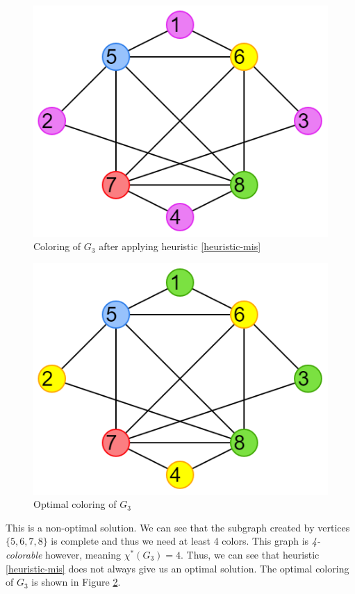 \documentclass{article}
\newcounter{heuristic} \setcounter{heuristic}{0}
\theoremstyle{definition}
\begin{document}
\begin{multicols}{2}
  \begin{figure}[H]
  \centering
  \includegraphics[scale=0.5]{images/mis-2.png}
  \caption{Coloring of \(G_3\) after applying heuristic \ref{heuristic-mis}}\label{fig:ex3-colored}
  \end{figure}

  \begin{figure}[H]
  \centering
  \includegraphics[scale=0.5]{images/mis-3.png}
  \caption{Optimal coloring of \(G_3\)}\label{fig:ex3-optimal}
  \end{figure}
\end{multicols}

This is a non-optimal solution. We can see that the subgraph created by vertices \(\{5, 6, 7, 8\}\) is complete and thus we need at least 4 colors. This graph is \emph{4-colorable} however, meaning \(\chi^{*}(G_3) = 4\). Thus, we can see that heuristic \ref{heuristic-mis} does not always give us an optimal solution. The optimal coloring of $G_3$ is shown in Figure \ref{fig:ex3-optimal}.
\end{document}
